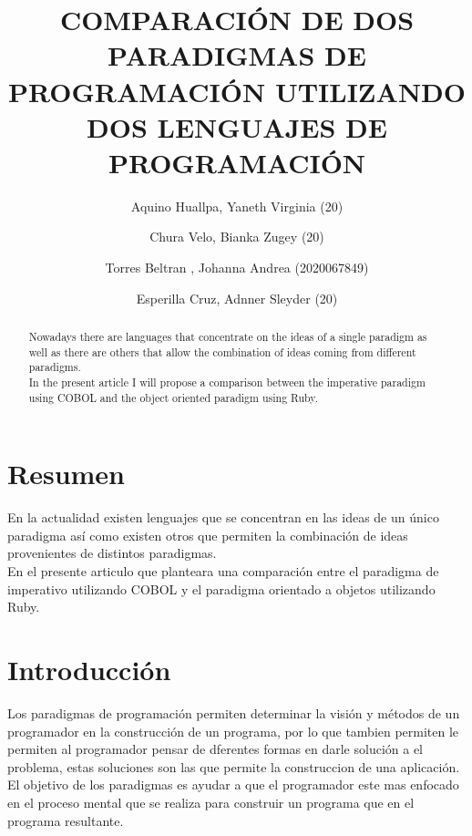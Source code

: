 \documentclass[preprint,12pt]{elsarticle}
\begin{document}
	
	\begin{frontmatter}

		\title{\huge  COMPARACIÓN DE DOS PARADIGMAS DE PROGRAMACIÓN UTILIZANDO DOS LENGUAJES DE PROGRAMACIÓN}
		\author{Aquino Huallpa, Yaneth Virginia				(20)}
		\author{Chura Velo, Bianka Zugey				(20)}
		\author{Torres Beltran , Johanna Andrea			(2020067849)}
		\author{Esperilla Cruz, Adnner Sleyder				(20)}
		\address{Tacna, Perú}
		
\begin{abstract}
Nowadays there are languages that concentrate on the ideas of a single paradigm as well as there are others that allow the combination of ideas coming from different paradigms.
\\
In the present article I will propose a comparison between the imperative paradigm using COBOL and the object oriented paradigm using Ruby.
\\
\end{abstract}

\end{frontmatter}

\section{Resumen}
En la actualidad existen lenguajes que se concentran en las ideas de un único paradigma así como existen otros que permiten la combinación de ideas provenientes de distintos paradigmas. 
\\
En el presente articulo que planteara una comparación entre el paradigma de imperativo utilizando COBOL y el paradigma orientado a objetos utilizando Ruby.
\\


\section{Introducción}
Los paradigmas de programación permiten determinar la visión y métodos de un programador en la construcción de un programa, por lo que tambien permiten le permiten al programador pensar de dferentes formas en darle solución a el problema, estas soluciones son las que permite la construccion de una aplicación. 
\\
El objetivo de los paradigmas es ayudar a que el programador este mas enfocado en el proceso mental que se realiza para construir un programa que en el programa resultante.
\\
\end{document}

